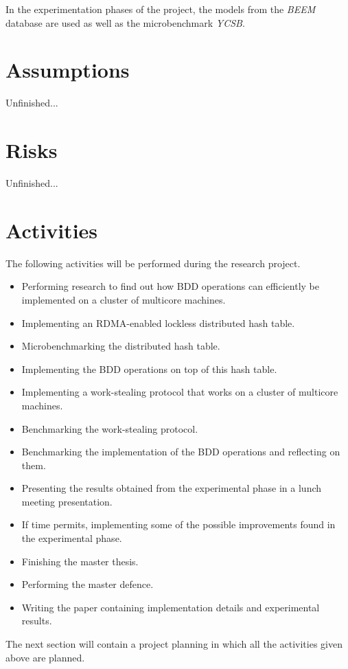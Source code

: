 In the experimentation phases of the project, the models from the \emph{BEEM} database are used as well as the microbenchmark \emph{YCSB}.

\section{Assumptions}
Unfinished...

\section{Risks}
Unfinished...

\section{Activities}
The following activities will be performed during the research project.

\begin{itemize}
	\item Performing research to find out how BDD operations can efficiently be implemented on a cluster of multicore machines.
	\item Implementing an RDMA-enabled lockless distributed hash table.
	\item Microbenchmarking the distributed hash table.
	\item Implementing the BDD operations on top of this hash table.
	\item Implementing a work-stealing protocol that works on a cluster of multicore machines.
	\item Benchmarking the work-stealing protocol.
	\item Benchmarking the implementation of the BDD operations and reflecting on them.
	\item Presenting the results obtained from the experimental phase in a lunch meeting presentation.
	\item If time permits, implementing some of the possible improvements found in the experimental phase.
	\item Finishing the master thesis.
	\item Performing the master defence.
	\item Writing the paper containing implementation details and experimental results.
\end{itemize}

The next section will contain a project planning in which all the activities given above are planned.

